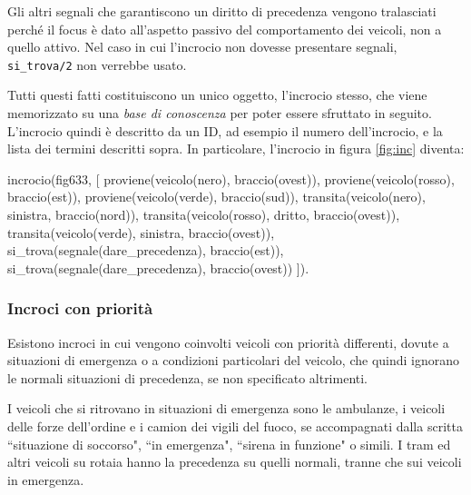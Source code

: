 Gli altri segnali che garantiscono un diritto di precedenza vengono tralasciati perché il focus è dato all'aspetto passivo del comportamento dei veicoli, non a quello attivo. Nel caso in cui l'incrocio non dovesse presentare segnali, \texttt{si\_trova/2} non verrebbe usato.


Tutti questi fatti costituiscono un unico oggetto, l'incrocio stesso, che viene memorizzato su una \emph{base di conoscenza} per poter essere sfruttato in seguito. L'incrocio quindi è descritto da un ID, ad esempio il numero dell'incrocio, e la lista dei termini descritti sopra. In particolare, l'incrocio in figura \ref{fig:inc} diventa:
\begin{verbatimtab}
incrocio(fig633, [
	proviene(veicolo(nero), braccio(ovest)),
	proviene(veicolo(rosso), braccio(est)),
	proviene(veicolo(verde), braccio(sud)),
	transita(veicolo(nero), sinistra, braccio(nord)),
	transita(veicolo(rosso), dritto, braccio(ovest)),
	transita(veicolo(verde), sinistra, braccio(ovest)),
	si_trova(segnale(dare_precedenza), braccio(est)),
	si_trova(segnale(dare_precedenza), braccio(ovest))
]).
\end{verbatimtab}

\subsubsection{Incroci con priorità}

Esistono incroci in cui vengono coinvolti veicoli con priorità differenti, dovute a situazioni di emergenza o a condizioni particolari del veicolo, che quindi ignorano le normali situazioni di precedenza, se non specificato altrimenti.

I veicoli che si ritrovano in situazioni di emergenza sono le ambulanze, i veicoli delle forze dell'ordine e i camion dei vigili del fuoco, se accompagnati dalla scritta ``situazione di soccorso", ``in emergenza", ``sirena in funzione" o simili. I tram ed altri veicoli su rotaia hanno la precedenza su quelli normali, tranne che sui veicoli in emergenza.


